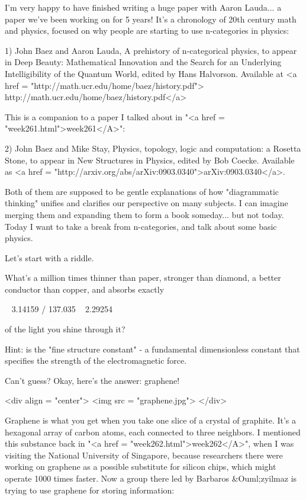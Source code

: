 

I'm very happy to have finished writing a huge paper with Aaron
Lauda... a paper we've been working on for 5 years!  It's a chronology
of 20th century math and physics, focused on why people are
starting to use n-categories in physics:

1) John Baez and Aaron Lauda, A prehistory of n-categorical physics,
to appear in Deep Beauty: Mathematical Innovation and the Search for 
an Underlying Intelligibility of the Quantum World, edited by Hans 
Halvorson.  Available at <a href = 
"http://math.ucr.edu/home/baez/history.pdf">
http://math.ucr.edu/home/baez/history.pdf</a>

This is a companion to a paper I talked about in "<a href =
"week261.html">week261</A>":

2) John Baez and Mike Stay, Physics, topology, logic and computation:
a Rosetta Stone, to appear in New Structures in Physics, edited by Bob
Coecke.  Available as <a href =
"http://arxiv.org/abs/arXiv:0903.0340">arXiv:0903.0340</a>.

Both of them are supposed to be gentle explanations of how 
"diagrammatic thinking" unifies and clarifies our perspective
on many subjects.  I can imagine merging them and expanding
them to form a book someday... but not today.  Today I want to 
take a break from n-categories, and talk about some basic physics.

Let's start with a riddle. 

What's a million times thinner than paper, stronger than diamond,
a better conductor than copper, and absorbs exactly 

\pi  \alpha  ~ 3.14159 / 137.035 ~ 2.29254%
 
of the light you shine through it?   

Hint: \alpha  is the "fine structure constant" - a fundamental 
dimensionless constant that specifies the strength of the 
electromagnetic force.

Can't guess?  Okay, here's the answer: graphene!  

<div align = "center">
<img src = "graphene.jpg">
</div>

Graphene is what you get when you take one slice of a crystal of
graphite.  It's a hexagonal array of carbon atoms, each connected to
three neighbors.  I mentioned this substance back in "<a href =
"week262.html">week262</A>", when I was visiting the National
University of Singapore, because researchers there were working on
graphene as a possible substitute for silicon chips, which might
operate 1000 times faster.  Now a group there led by Barbaros &Ouml;zyilmaz
is trying to use graphene for storing information:

